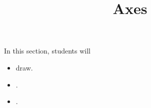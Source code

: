 \documentclass{ximera}
\title{Axes}
\begin{document}
\begin{abstract}
%
\end{abstract}
\maketitle























\begin{sectionOutcomes}
In this section, students will 

\begin{itemize}
\item draw.
\item .
\item .
\end{itemize}
\end{sectionOutcomes}
\end{document}
